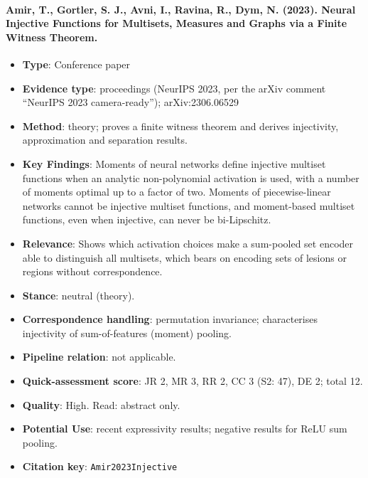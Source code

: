 \documentclass[journal,onecolumn]{IEEEtran}
\begin{document}
\paragraph{Amir, T., Gortler, S. J., Avni, I., Ravina, R., Dym, N. (2023). Neural Injective Functions for Multisets, Measures and Graphs via a Finite Witness Theorem.~\cite{Amir2023Injective}}\mbox{}

\begin{itemize}

\item{} \textbf{Type}: Conference paper

\item{} \textbf{Evidence type}: proceedings (NeurIPS 2023, per the arXiv comment ``NeurIPS 2023 camera-ready''); arXiv:2306.06529

\item{} \textbf{Method}: theory; proves a finite witness theorem and derives injectivity, approximation and separation results.

\item{} \textbf{Key Findings}: Moments of neural networks define injective multiset functions when an analytic non-polynomial activation is used, with a number of moments optimal up to a factor of two. Moments of piecewise-linear networks cannot be injective multiset functions, and moment-based multiset functions, even when injective, can never be bi-Lipschitz.

\item{} \textbf{Relevance}: Shows which activation choices make a sum-pooled set encoder able to distinguish all multisets, which bears on encoding sets of lesions or regions without correspondence.

\item{} \textbf{Stance}: neutral (theory).

\item{} \textbf{Correspondence handling}: permutation invariance; characterises injectivity of sum-of-features (moment) pooling.

\item{} \textbf{Pipeline relation}: not applicable.

\item{} \textbf{Quick-assessment score}: JR 2, MR 3, RR 2, CC 3 (S2: 47), DE 2; total 12.

\item{} \textbf{Quality}: High. Read: abstract only.

\item{} \textbf{Potential Use}: recent expressivity results; negative results for ReLU sum pooling.

\item{} \textbf{Citation key}: \texttt{Amir2023Injective}

\end{itemize}
\end{document}
